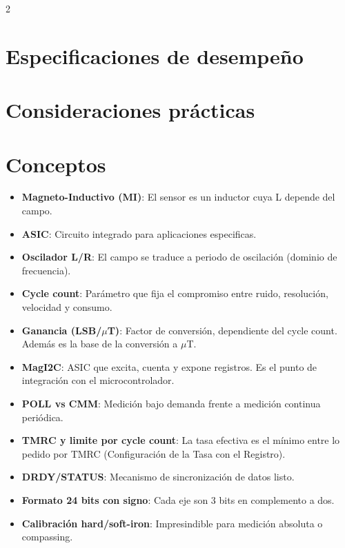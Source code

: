 \documentclass[11pt,letterpaper]{article}
\begin{document}
\begin{multicols*}{2}
\section{Especificaciones de desempeño}

\section{Consideraciones prácticas}
\section{Conceptos}
\begin{itemize}
    \item \textbf{Magneto-Inductivo (MI)}: El sensor es un inductor cuya L depende del campo.
    \item \textbf{ASIC}: Circuito integrado para aplicaciones especificas.
    \item \textbf{Oscilador L/R}: El campo se traduce a periodo de oscilación (dominio de frecuencia).
    \item \textbf{Cycle count}: Parámetro que fija el compromiso entre ruido, resolución, velocidad y consumo.
    \item \textbf{Ganancia (LSB/$\mu$T)}: Factor de conversión, dependiente del cycle count. Además es la base de la conversión a $\mu$T.
    \item \textbf{MagI2C}: ASIC que excita, cuenta y expone registros. Es el punto de integración con el microcontrolador.
    \item \textbf{POLL vs CMM}: Medición bajo demanda frente a medición continua periódica.
    \item \textbf{TMRC y limite por cycle count}: La tasa efectiva es el mínimo entre lo pedido por TMRC (Configuración de la Tasa con el Registro).
    \item \textbf{DRDY/STATUS}: Mecanismo de sincronización de datos listo.
    \item \textbf{Formato 24 bits con signo}: Cada eje son 3 bits en complemento a dos.
    \item \textbf{Calibración hard/soft-iron}: Impresindible para medición absoluta o compassing.
\end{itemize}



\printbibliography
\end{multicols*}
\end{document}
